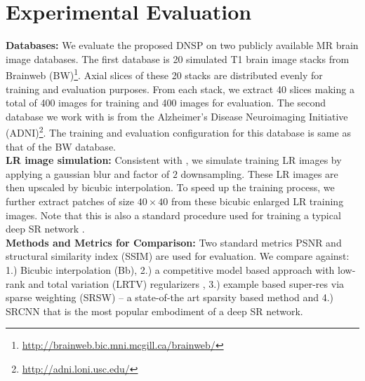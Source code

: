\documentclass{article}
\def\sqz{\vspace{-3pt}}
\begin{document}
\section{Experimental Evaluation}
\sqz
\label{sec:Results}
\textbf{Databases:} We evaluate the proposed DNSP on two publicly available MR brain image databases. The first database is 20 simulated T1 brain image stacks from Brainweb (BW)\footnote{\url{http://brainweb.bic.mni.mcgill.ca/brainweb/}}. Axial slices of these 20 stacks are distributed evenly for training and evaluation purposes. From each stack, we extract 40 slices making a total of 400 images for training and 400 images for evaluation. The second database we work with is from the Alzheimer's Disease Neuroimaging Initiative (ADNI)\footnote{\url{http://adni.loni.usc.edu/}}. The training and evaluation configuration for this database is same as that of the BW database.\\
\textbf{LR image simulation: } Consistent with \cite{shi2015lrtv}, we simulate training LR images by applying a gaussian blur and factor of $2$ downsampling. These LR images are then upscaled by bicubic interpolation. To speed up the training process, we further extract patches of size $40\times 40$ from these bicubic enlarged LR training images. Note that this is also a standard procedure used for training a typical deep SR network \cite{dong2016image, kim2016accurate,guo2017deep}.\\
\textbf{Methods and Metrics for Comparison: }Two standard metrics PSNR and structural similarity index (SSIM) \cite{brunet2017optimizing} are used for evaluation. We compare  against: 1.) Bicubic interpolation (Bb), 2.) a competitive model based approach with low-rank and total variation (LRTV) regularizers \cite{shi2015lrtv}, 3.) example based super-res via sparse weighting (SRSW) \cite{trinh2014novel} -- a state-of-the art sparsity based method and 4.) SRCNN \cite{dong2016image, yang2016super} that is the most popular embodiment of a deep SR network.\\
\end{document}
